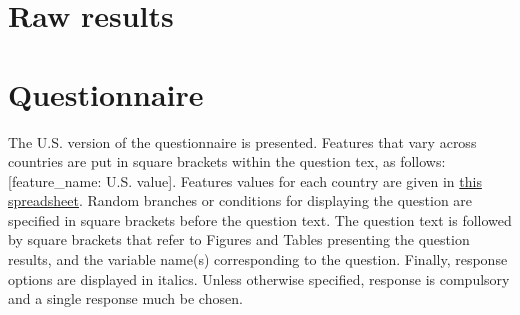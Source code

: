 \clearpage
\section{Raw results%
}\label{app:raw_results}




\renewcommand{\theenumi}{\arabic{enumi}}
\clearpage
\section{Questionnaire}\label{app:questionnaire}
The U.S. version of the questionnaire is presented. Features that vary across countries are put in square brackets within the question tex, as follows: [feature\_name: U.S. value]. Features values for each country are given in \href{https://github.com/bixiou/robustness_global_redistr/raw/main/questionnaire/sources.xlsx}{this spreadsheet}. Random branches or conditions for displaying the question are specified in square brackets before the question text. The question text is followed by square brackets that refer to Figures and Tables presenting the question results, and the variable name(s) corresponding to the question. Finally, response options are displayed in italics. 
Unless otherwise specified, response is compulsory and a single response much be chosen.


